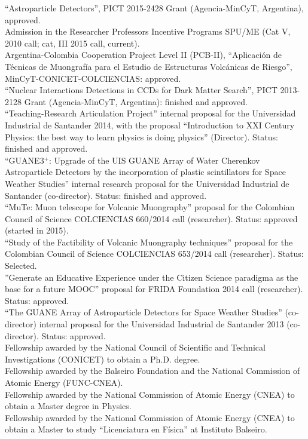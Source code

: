  ``Astroparticle Detectors'', PICT 2015-2428 Grant (Agencia-MinCyT, Argentina), approved.\\
 Admission in the Researcher Professors Incentive Programs SPU/ME (Cat V, 2010 call; cat, III 2015 call, current).\\
\ifres
\else
{} Argentina-Colombia Cooperation Project Level II (PCB-II), ``Aplicación de Técnicas de Muongrafía para el Estudio de Estructuras Volcánicas de Riesgo'', MinCyT-CONICET-COLCIENCIAS: approved.\\
 ``Nuclear Interactions Detections in CCDs for Dark Matter Search'', PICT 2013-2128 Grant (Agencia-MinCyT, Argentina): finished and approved.\\
 ``Teaching-Research Articulation Project'' internal proposal for the Universidad Industrial de Santander 2014, with the proposal ``Introduction to XXI Century Physics: the best way to learn physics is doing physics'' (Director). Status: finished and approved.\\
 ``GUANE3$^+$: Upgrade of the UIS GUANE Array of Water Cherenkov Astroparticle Detectors by the incorporation of plastic scintillators for Space Weather Studies'' internal research proposal for the Universidad Industrial de Santander (co-director). Status: finished and approved.\\
 ``MuTe: Muon telescope for Volcanic Muongraphy'' proposal for the Colombian Council of Science COLCIENCIAS 660/2014 call (researcher). Status: approved (started in 2015).\\
 ``Study of the Factibility of Volcanic Muongraphy techniques'' proposal for the Colombian Council of Science COLCIENCIAS 653/2014 call (researcher). Status: Selected.\\
 ''Generate an Educative Experience under the Citizen Science paradigma as the base for a future MOOC'' proposal for FRIDA Foundation 2014 call (researcher). Status: approved.\\
 ``The GUANE Array of Astroparticle Detectors for Space Weather Studies'' (co-director) internal proposal for the Universidad Industrial de Santander 2013 (co-director). Status: approved.\\
Fellowship awarded by the National Council of Scientific and Technical Investigations (CONICET) to obtain a Ph.D. degree.\\
Fellowship awarded by the Balseiro Foundation and the National Commission of Atomic Energy (FUNC-CNEA).\\
Fellowship awarded by the National Commission of Atomic Energy (CNEA) to obtain a Master degree in Physics.\\
Fellowship awarded by the National Commission of Atomic Energy (CNEA) to obtain a Master to study ``Licenciatura en Física'' at Instituto Balseiro.\\
\fi
\else
